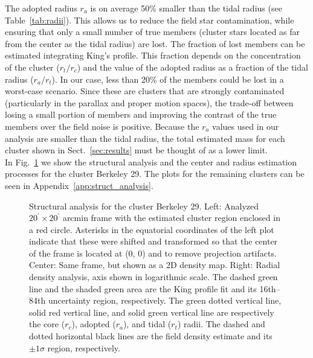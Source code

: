 \documentclass{aa}
\begin{document}
  The adopted radius $r_{a}$ is on average 50\% smaller than the
  tidal radius (see Table~\ref{tab:radii}). This allows us to reduce the field star contamination, while ensuring that only a small number of
  true members (cluster stars located as far from the center as the tidal
  radius) are lost.
  The fraction of lost members can be estimated integrating King's profile. This
  fraction depends on the concentration of the cluster ($r_{t}/r_{c}$) and the
  value of the adopted radius as a fraction of the tidal radius ($r_{a}/r_{t}$).
  In our case, less than 20\% of the members could be lost in a worst-case
  scenario. Since these are clusters that are strongly contaminated 
  (particularly in the parallax and proper motion spaces), the trade-off
  between losing a small portion of members and improving the contrast of the
  true members over the field noise is positive.
  Because the $r_{a}$ values used in our analysis are smaller than the tidal radius,
   the total estimated mass for each cluster shown in
  Sect.~\ref{sec:results} must be thought of as a lower limit.\\

  In Fig.~\ref{fig:BER29_struct} we show the structural analysis and the center and
  radius estimation processes for the cluster Berkeley 29. The plots for the
  remaining clusters can be seen in Appendix~\ref{app:struct_analysis}.


  \begin{figure}
   \caption{Structural analysis for the cluster Berkeley 29.
   Left: Analyzed $20^{\prime} \times 20^{\prime}$ arcmin frame with the
   estimated cluster region enclosed in a red circle. Asterisks in the
   equatorial coordinates of the left plot indicate that these were shifted
   and transformed so that the center of the frame is located at (0, 0) and to
   remove projection artifacts.
   Center: Same frame, but shown as a 2D density map.
   Right: Radial density analysis, axis shown in logarithmic scale.
   The dashed green line and the shaded green area are the King profile fit
   and its 16th--84th uncertainty region, respectively. The green dotted vertical
   line, solid red vertical line, and solid green vertical line are respectively the core 
   ($r_{c}$), adopted ($r_{a}$), and tidal ($r_{t}$) radii. The
   dashed and dotted horizontal black lines are the field density estimate and
   its $\pm1\sigma$ region, respectively.}
   \label{fig:BER29_struct}
  \end{figure}
\end{document}
